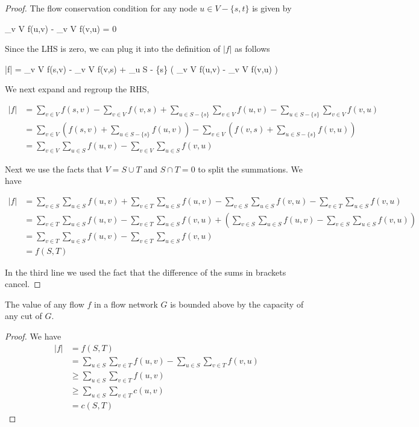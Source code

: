 \begin{proof}
  The flow conservation condition for any node $u \in V - \{s,t\}$ is given by

  \bee
  \sum_{v \in V} f(u,v) - \sum_{v \in V} f(v,u) = 0
  \eee

  Since the LHS is zero, we can plug it into the definition of $|f|$ as follows

  \bee
  |f| = \sum_{v \in V} f(s,v) - \sum_{v \in V} f(v,s) + \sum_{u \in S - \{s\}} \left( \sum_{v \in V} f(u,v) - \sum_{v \in V} f(v,u) \right)
  \eee

  We next expand and regroup the RHS,

  \begin{align*}
  |f| &= \sum_{v \in V} f(s,v) - \sum_{v \in V} f(v,s) + \sum_{u \in S - \{s\}} \sum_{v \in V} f(u,v) - \sum_{u \in S - \{s\}} \sum_{v \in V} f(v,u) \\
      &= \sum_{v \in V} \left( f(s,v) + \sum_{u \in S - \{s\}}f(u,v)  \right) - \sum_{v \in V} \left( f(v,s) + \sum_{u \in S - \{s\}} f(v,u)  \right) \\
      &= \sum_{v \in V} \sum_{u \in S} f(u,v) - \sum_{v \in V} \sum_{u \in S} f(v,u)
  \end{align*}

  Next we use the facts that $V = S \cup T$ and $S \cap T = 0$ to split the summations. We have

  \begin{align*}
    |f| &= \sum_{v \in S} \sum_{u \in S} f(u,v)  + \sum_{v \in T} \sum_{u \in S} f(u,v) - \sum_{v \in S} \sum_{u \in S} f(v,u) - \sum_{v \in T} \sum_{u \in S} f(v,u) \\
        &= \sum_{v \in T} \sum_{u \in S} f(u,v)  - \sum_{v \in T} \sum_{u \in S} f(v,u) + \left(\sum_{v \in S} \sum_{u \in S} f(u,v) - \sum_{v \in S} \sum_{u \in S} f(v,u) \right)\\
        &= \sum_{v \in T} \sum_{u \in S} f(u,v)  - \sum_{v \in T} \sum_{u \in S} f(v,u) \\
        &= f(S,T)
  \end{align*}

  In the third line we used the fact that the difference of the sums in brackets cancel.
\end{proof}


\begin{theorem}
  The value of any flow $f$ in a flow network $G$ is bounded above by the capacity of any cut of $G$.
\end{theorem}

\begin{proof}
  We have
  \begin{align*}
    |f| &= f(S,T) \\
        &= \sum_{u \in S} \sum_{v \in T} f(u,v) - \sum_{u \in S} \sum_{v \in T} f(v,u) \\
        &\geq \sum_{u \in S} \sum_{v \in T} f(u,v) \\
        &\geq \sum_{u \in S} \sum_{v \in T} c(u,v) \\
        &= c(S,T)
  \end{align*}
  
\end{proof}


